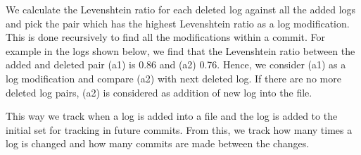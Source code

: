 We calculate the Levenshtein ratio for each deleted log against all the added logs and pick the pair which has the highest Levenshtein ratio  as a log modification. This is done recursively to find all the modifications within a commit. For example in the logs shown below, we find that the Levenshtein ratio between the added and deleted pair (a1) is 0.86 and (a2) 0.76. Hence, we consider (a1) as a log modification and compare (a2) with next deleted log. If there are no more deleted log pairs, (a2) is considered as addition of new log into the file. 

This way we track when a log is added into a file and the log is added to the initial set for tracking in future commits. From this, we track how many times a log is changed and how many commits are made between the changes. 







